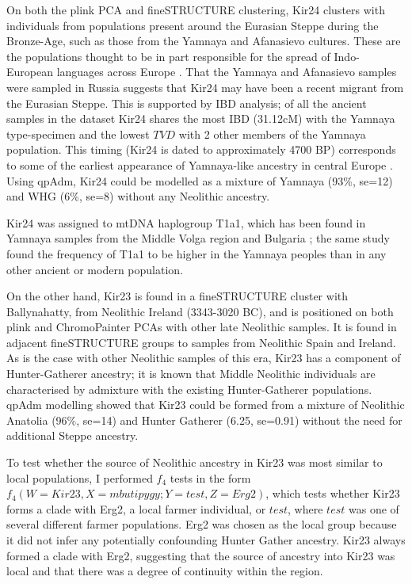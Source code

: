 On both the plink PCA and fineSTRUCTURE clustering, Kir24 clusters with individuals from populations present around the Eurasian Steppe during the Bronze-Age, such as those from the Yamnaya and Afanasievo cultures. These are the populations thought to be in part responsible for the spread of Indo-European languages across Europe \cite{Haak2015}.  That the Yamnaya and Afanasievo samples were sampled in Russia suggests that Kir24 may have been a recent migrant from the Eurasian Steppe. This is supported by IBD analysis; of all the ancient samples in the dataset Kir24 shares the most IBD (31.12cM) with the Yamnaya type-specimen and the lowest $TVD$ with 2 other members of the Yamnaya population. This timing (Kir24 is dated to approximately 4700 BP) corresponds to some of the earliest appearance of Yamnaya-like ancestry in central Europe \cite{Racimo8989}. Using qpAdm, Kir24 could be modelled as a mixture of Yamnaya (93\%, se=12) and WHG (6\%, se=8) without any Neolithic ancestry. 

Kir24 was assigned to mtDNA haplogroup T1a1, which has been found in Yamnaya samples from the Middle Volga region and Bulgaria \cite{keyser2009ancient}; the same study found the frequency of T1a1 to be higher in the Yamnaya peoples than in any other ancient or modern population. 

On the other hand, Kir23 is found in a fineSTRUCTURE cluster with Ballynahatty, from Neolithic Ireland (3343-3020 BC), and is positioned on both plink and ChromoPainter PCAs with other late Neolithic samples. It is found in adjacent fineSTRUCTURE groups to samples from Neolithic Spain and Ireland. As is the case with other Neolithic samples of this era, Kir23 has a component of Hunter-Gatherer ancestry; it is known that Middle Neolithic individuals are characterised by admixture with the existing Hunter-Gatherer populations. qpAdm modelling showed that Kir23 could be formed from a mixture of Neolithic Anatolia (96\%, se=14)  and Hunter Gatherer (6.25, se=0.91) without the need for additional Steppe ancestry. 

To test whether the source of Neolithic ancestry in Kir23 was most similar to local populations, I performed $f_{4}$ tests in the form $f_{4}(W=Kir23, X=mbutipygy; Y=test, Z=Erg2)$, which tests whether Kir23 forms a clade with Erg2, a local farmer individual, or $test$, where $test$ was one of several different farmer populations. Erg2 was chosen as the local group because it did not infer any potentially confounding Hunter Gather ancestry. Kir23 always formed a clade with Erg2, suggesting that the source of ancestry into Kir23 was local and that there was a degree of continuity within the region. 


